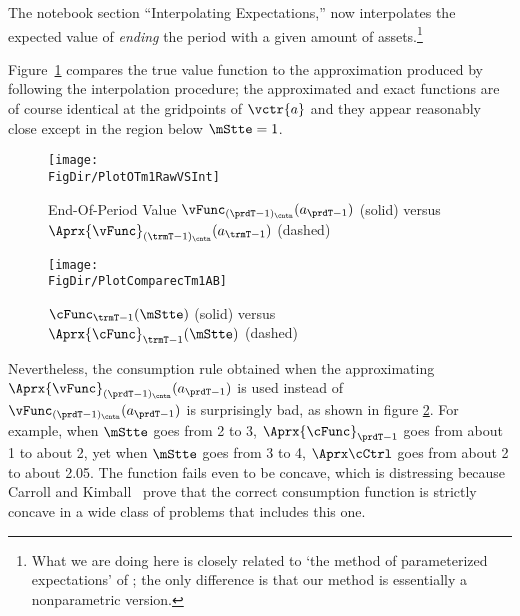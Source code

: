 \documentclass[\econtexRoot/SolvingMicroDSOPs]{subfiles}
\begin{document}
The notebook section ``Interpolating Expectations,'' now interpolates the expected value of \textit{ending} the period with a given amount of assets.\footnote{What we are doing here is closely related to `the method of parameterized expectations' of \cite{denHaanMarcet:parameterized}; the only difference is that our method is essentially a nonparametric version.}  %

Figure~\ref{fig:PlotOTm1RawVSInt} compares the true value function to the approximation produced by following the interpolation procedure; the approximated and exact functions are of course identical at the gridpoints of $\vctr{a}$ and they appear reasonably close except in the region below $\mStte=1$.

\hypertarget{PlotOTm1RawVSInt}{}
\begin{figure}
  \centerline{\texttt{[image: \\FigDir/PlotOTm1RawVSInt]}}
  \caption{End-Of-Period Value $\vFunc_{({\prdT-1})_\cntn}(a_{\prdT-1})$ (solid) versus $\Aprx{\vFunc}_{({\trmT-1})_\cntn}(a_{\trmT-1})$ (dashed)}
  \label{fig:PlotOTm1RawVSInt}
\end{figure}

\hypertarget{PlotComparecTm1AB}{}
\begin{figure}
  \centerline{\texttt{[image: \\FigDir/PlotComparecTm1AB]}}
  \caption{$\cFunc_{\trmT-1}(\mStte)$ (solid) versus $\Aprx{\cFunc}_{\trmT-1}(\mStte)$ (dashed)}
  \label{fig:PlotComparecTm1AB}
\end{figure}


Nevertheless, the consumption rule obtained when the approximating $\Aprx{\vFunc}_{({\prdT-1})_\cntn}(a_{\prdT-1})$ is used instead of $\vFunc_{({\prdT-1})_\cntn}(a_{\prdT-1})$ is surprisingly bad, as shown in figure \ref{fig:PlotComparecTm1AB}.  For example, when $\mStte$ goes from 2 to 3, $\Aprx{\cFunc}_{\prdT-1}$ goes from about 1 to about 2, yet when $\mStte$ goes from 3 to 4, $\Aprx\cCtrl$ goes from about 2 to about 2.05.  The function fails even to be concave, which is distressing because Carroll and Kimball~\citeyearpar{ckConcavity} prove that the correct consumption function is strictly concave in a wide class of problems that includes this one.
\end{document}
